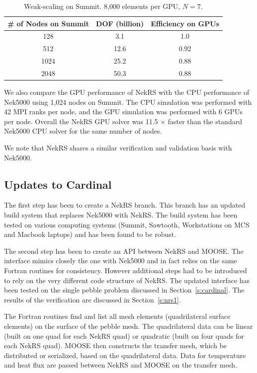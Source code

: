 \begin{table} [!b]
\begin{center} \begin{tabular}{ccc}
\toprule
\# of Nodes on Summit & DOF (billion) &  Efficiency on GPUs \\
\midrule
 128  & 3.1  & 1.0   \\
 512  & 12.6 & 0.92  \\
 1024 & 25.2 & 0.88  \\
 2048 & 50.3 & 0.88 \\
\bottomrule \end{tabular} \end{center}
\caption{\label{wscaling} Weak-scaling on Summit. 8,000 elements per GPU, $N=7$.}
\end{table}

We also compare the GPU performance of NekRS with the CPU performance of Nek5000 using 1,024 nodes on Summit. The CPU simulation was performed with 42 MPI ranks per node, and the GPU simulation was performed with 6 GPUs  per node. Overall the NekRS GPU solver was 11.5 $\times$ faster than the standard Nek5000 CPU solver for the same number of nodes.

We note that NekRS shares a similar verification and validation basis with Nek5000.

\subsection{Updates to Cardinal}

The first step has been to create a NekRS branch. This branch has an updated build system that replaces Nek5000 with NekRS. The build system has been tested on various computing systems (Summit, Sawtooth, Workstations on MCS and Macbook laptops) and has been found to be robust.

The second step has been to create an API between NekRS and MOOSE. The interface mimics closely the one with Nek5000 and in fact relies on the same Fortran routines for consistency. However additional steps had to be introduced to rely on the very different code structure of NekRS. The updated interface has been tested on the single pebble problem discussed in Section~\ref{s:cardinal}. The results of the verification are discussed in Section~\ref{s:nrs1}.

The Fortran routines find and list all mesh elements (quadrilateral surface elements) on the surface of the pebble mesh. The quadrilateral data can be linear (built on one quad for each NekRS quad) or quadratic (built on four quads for each NekRS quad). MOOSE then constructs the transfer mesh, which be distributed or serialized, based on the quadrilateral data. Data for temperature and heat flux are passed between NekRS and MOOSE on the transfer mesh.

